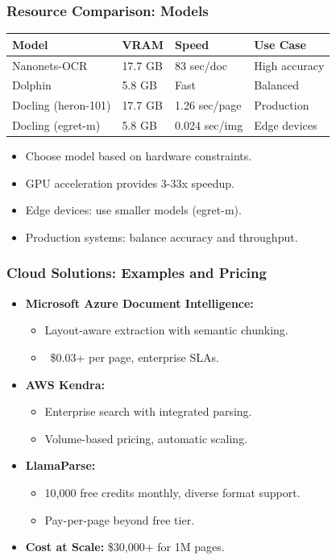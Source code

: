 \begin{frame}[fragile]\frametitle{Resource Comparison: Models}
\begin{table}[h]
\centering
\tiny
\begin{tabular}{|l|l|l|l|}
\hline
\textbf{Model} & \textbf{VRAM} & \textbf{Speed} & \textbf{Use Case} \\
\hline
Nanonets-OCR & 17.7 GB & 83 sec/doc & High accuracy \\
Dolphin & 5.8 GB & Fast & Balanced \\
Docling (heron-101) & 17.7 GB & 1.26 sec/page & Production \\
Docling (egret-m) & 5.8 GB & 0.024 sec/img & Edge devices \\
\hline
\end{tabular}
\end{table}
      \begin{itemize}
        \item Choose model based on hardware constraints.
        \item GPU acceleration provides 3-33x speedup.
        \item Edge devices: use smaller models (egret-m).
        \item Production systems: balance accuracy and throughput.
      \end{itemize}
\end{frame}

\begin{frame}[fragile]\frametitle{Cloud Solutions: Examples and Pricing}
      \begin{itemize}
        \item \textbf{Microsoft Azure Document Intelligence:}
        \begin{itemize}
          \item Layout-aware extraction with semantic chunking.
          \item ~\$0.03+ per page, enterprise SLAs.
        \end{itemize}
        \item \textbf{AWS Kendra:}
        \begin{itemize}
          \item Enterprise search with integrated parsing.
          \item Volume-based pricing, automatic scaling.
        \end{itemize}
        \item \textbf{LlamaParse:}
        \begin{itemize}
          \item 10,000 free credits monthly, diverse format support.
          \item Pay-per-page beyond free tier.
        \end{itemize}
        \item \textbf{Cost at Scale:} \$30,000+ for 1M pages.
      \end{itemize}
\end{frame}

